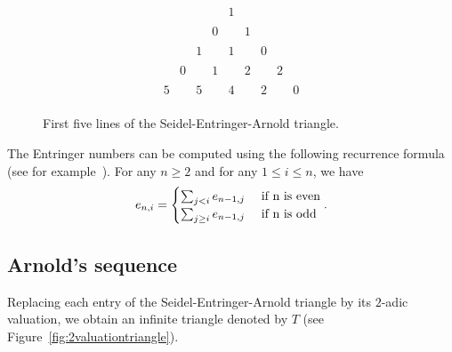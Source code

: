 \documentclass[12pt]{amsart}
\begin{document}
\begin{figure}[htpb]
\[
\begin{matrix}
&&&&1&&&& \\
&&&&&&&& \\
&&&0&&1&&& \\
&&&&&&&& \\
&&1&&1&&0&& \\
&&&&&&&& \\
&0&&1&&2&&2& \\
&&&&&&&& \\
5&&5&&4&&2&&0 \\
\end{matrix}
\]
\caption{First five lines of the Seidel-Entringer-Arnold triangle.}
\label{fig:SEAtriangle}
\end{figure}

The Entringer numbers can be computed using the following recurrence formula (see for example~\cite{S97}). For any $n\geq2$ and for any $1\leq i \leq n$, we have
\begin{equation}
e_{n,i}=
\begin{cases}
\sum_{j<i} e_{n-1,j} &\text{ if } $n$ \text{ is even} \\
\sum_{j\geq i} e_{n-1,j} &\text{ if } $n$ \text{ is odd}
\end{cases}.
\end{equation}

\subsection{Arnold's sequence}

Replacing each entry of the Seidel-Entringer-Arnold triangle by its $2$-adic valuation, we obtain an infinite triangle denoted by $T$ (see Figure~\ref{fig:2valuationtriangle}).
\end{document}
